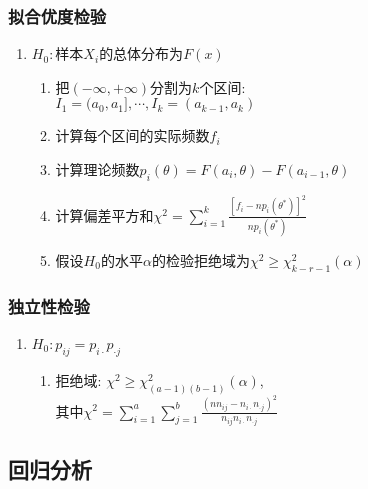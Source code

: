 \subsubsection{拟合优度检验}

\begin{enumerate}
\item $H_0:$样本$X_i$的总体分布为$F(x)$
\begin{enumerate}
\item 把$(-\infty,+\infty)$分割为$k$个区间:\\$I_1=(a_0,a_1], \cdots, I_k=(a_{k-1},a_k)$
\item 计算每个区间的实际频数$f_i$
\item 计算理论频数$p_i(\theta)=F(a_i,\theta)-F(a_{i-1},\theta)$
\item 计算偏差平方和$\chi^2=\sum_{i=1}^k\frac{[f_i-np_i(\theta^*)]^2}{np_i(\theta^*)}$
\item 假设$H_0$的水平$\alpha$的检验拒绝域为$\chi^2\ge\chi^2_{k-r-1}(\alpha)$
\end{enumerate}
\end{enumerate}

\subsubsection{独立性检验}

\begin{enumerate}
\item $H_0:p_{ij}=p_{i\cdot}p_{\cdot j}$
\begin{enumerate}
\item 拒绝域: $\chi^2\ge\chi^2_{(a-1)(b-1)}(\alpha)$,\\
其中$\chi^2=\sum_{i=1}^a\sum_{j=1}^b\frac{(nn_{ij}-n_{i\cdot}n_{\cdot j})^2}{n_{ij}n_{i\cdot}n_{\cdot j}}$
\end{enumerate}
\end{enumerate}


\subsection{回归分析}


